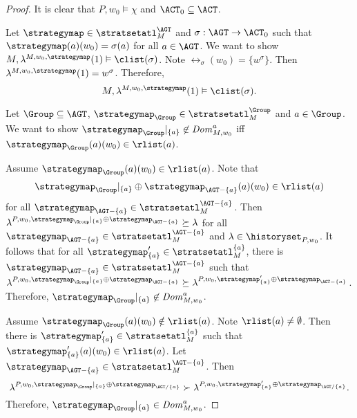 \begin{proof}
  It is clear that $P,w_0\vDash \chi$ and $\ACT_0\subseteq \ACT$.
  
  Let $\strategymap\in \stratsetatl_{M}^\AGT$ and $\sigma: \AGT \to \ACT_0$ such that $\strategymap(a)(w_0)=\sigma(a)$ for all $a\in \AGT$. We want to show $M,\lambda^{M,w_0,\strategymap}(1)\vDash \clist(\sigma)$. Note $\rel_\sigma(w_0)=\{w^\sigma\}$. Then $\lambda^{M,w_0,\strategymap}(1)=w^\sigma$. Therefore, $$M,\lambda^{M,w_0,\strategymap}(1)\vDash \clist(\sigma).$$

  Let $\Group\subseteq \AGT$, $\strategymap_{\Group}\in \stratsetatl_{M}^{\Group}$ and $a\in \Group$. We want to show $\strategymap_{\Group}|_{\{a\}}\not \in \mathit{Dom}_{M,w_0}^a$ iff $\strategymap_{\Group}(a)(w_0)\in \rlist(a)$. 

  Assume $\strategymap_{\Group}(a)(w_0)\in \rlist(a)$. Note that $$\strategymap_{\Group}|_{\{a\}}\oplus \strategymap_{\AGT-\{a\}}(a)(w_0)\in \rlist(a)$$ for all $\strategymap_{\AGT-\{a\}}\in \stratsetatl_{M}^{\AGT-\{a\}}$. Then  $\lambda^{P,w_0,\strategymap_{\Group}|_{\{a\}}\oplus \strategymap_{\AGT-\{a\}}}\succeq \lambda$ for all $\strategymap_{\AGT-\{a\}}\in \stratsetatl_{M}^{\AGT-\{a\}}$ and $\lambda \in \historyset_{P,w_0}$. It follows that for all $\strategymap'_{\{a\}}\in \stratsetatl_{M}^{\{a\}}$, there is $\strategymap_{\AGT-\{a\}}\in \stratsetatl_{M}^{\AGT-\{a\}}$ such that $\lambda^{P,w_0,\strategymap_{\Group}|_{\{a\}}\oplus \strategymap_{\AGT-\{a\}}}\succeq \lambda^{P,w_0,\strategymap'_{\{a\}}\oplus \strategymap_{\AGT-\{a\}}}$. Therefore, $\strategymap_{\Group}|_{\{a\}}\not \in \mathit{Dom}_{M,w_0}^a$.
  
  Assume $\strategymap_{\Group}(a)(w_0)\notin \rlist(a)$. Note $\rlist(a)\neq \emptyset $. Then there is $\strategymap'_{\{a\}}\in \stratsetatl_{M}^{\{a\}}$ such that $\strategymap'_{\{a\}}(a)(w_0)\in \rlist(a)$. Let $\strategymap_{\AGT-\{a\}}\in \stratsetatl_{M}^{\AGT-\{a\}}$. Then $$\lambda^{P,w_0,\strategymap_{\Group}|_{\{a\}}\oplus \strategymap_{\AGT/\{a\}}}\succ \lambda^{P,w_0,\strategymap'_{\{a\}}\oplus \strategymap_{\AGT/\{a\}}}.$$%
  Therefore, $\strategymap_{\Group}|_{\{a\}}\in \mathit{Dom}_{M,w_0}^a$.    
\end{proof}
